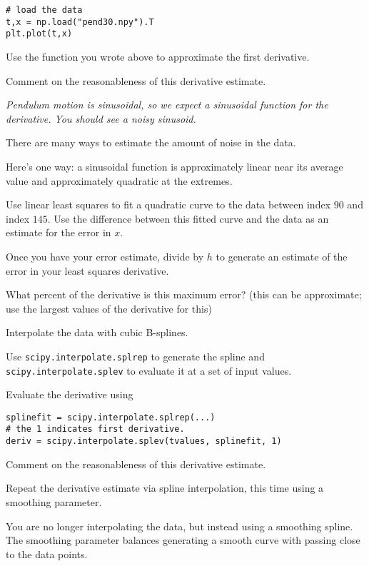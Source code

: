 \documentclass[12pt,letterpaper,noanswers]{exam}
\begin{document}
\begin{questions}
\begin{parts}
\begin{verbatim}
# load the data
t,x = np.load("pend30.npy").T
plt.plot(t,x)
\end{verbatim}

Use the function you wrote above to approximate the first derivative.

Comment on the reasonableness of this derivative estimate.

\emph{Pendulum motion is sinusoidal, so we expect a sinusoidal function for the derivative.  You should see a noisy sinusoid.}

\item There are many ways to estimate the amount of noise in the data.  

Here's one way: a sinusoidal function is approximately linear near its average value and approximately quadratic at the extremes.  

Use linear least squares to fit a quadratic curve to the data between index $90$ and index $145$.  Use the difference between this fitted curve and the data as an estimate for the error in $x$.

Once you have your error estimate, divide by $h$ to generate an estimate of the error in your least squares derivative.

What percent of the derivative is this maximum error? (this can be approximate; use the largest values of the derivative for this)



\item Interpolate the data with cubic B-splines.

Use \texttt{scipy.interpolate.splrep} to generate the spline and \texttt{scipy.interpolate.splev} to evaluate it at a set of input values.

Evaluate the derivative using
\begin{verbatim}
splinefit = scipy.interpolate.splrep(...)
# the 1 indicates first derivative.
deriv = scipy.interpolate.splev(tvalues, splinefit, 1)
\end{verbatim}

Comment on the reasonableness of this derivative estimate.

\item Repeat the derivative estimate via spline interpolation, this time using a smoothing parameter.

You are no longer interpolating the data, but instead using a smoothing spline.  The smoothing parameter balances generating a smooth curve with passing close to the data points.


\end{parts}
\end{questions}
\end{document}
